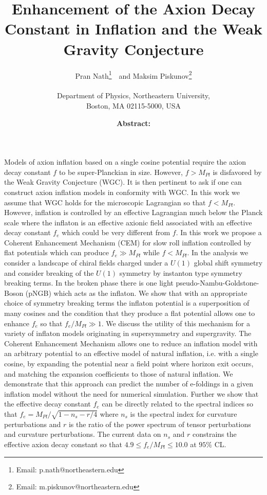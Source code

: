\documentclass[12pt]{article}
\author{
  Pran Nath\footnote{Email: p.nath@northeastern.edu}~\ and
  Maksim Piskunov\footnote{Email: m.piskunov@northeastern.edu}\\~\\
  Department of Physics, Northeastern University,\\
  Boston, MA 02115-5000, USA
}
\title{
  Enhancement of the Axion Decay Constant in Inflation and the Weak Gravity Conjecture
}
\begin{document}
\maketitle
\date

\textbf{Abstract:}
Models of axion inflation based on a single cosine potential require the axion decay constant $f$ to be super-Planckian in size.
However, $f > M_{Pl}$ is disfavored by the Weak Gravity Conjecture (WGC).
It is then pertinent to ask if one can construct axion inflation models in conformity with WGC.
In this work we assume that WGC holds for the microscopic Lagrangian so that $f < M_{Pl}$.
However, inflation is controlled by an effective Lagrangian much below the Planck scale where the inflaton is an effective axionic field associated with an effective decay constant $f_e$ which could be very different from $f$.
In this work we propose a Coherent Enhancement Mechanism (CEM) for slow roll inflation controlled by flat potentials which can produce $f_e \gg M_{Pl}$ while $f < M_{Pl}$.
In the analysis we consider a landscape of chiral fields charged under a $U\left(1\right)$ global shift symmetry and consider breaking of the $U\left(1\right)$ symmetry by instanton type symmetry breaking terms.
In the broken phase there is one light pseudo-Nambu-Goldstone-Boson (pNGB) which acts as the inflaton.
We show that with an appropriate choice of symmetry breaking terms the inflaton potential is a superposition of many cosines and the condition that they produce a flat potential allows one to enhance $f_e$ so that $f_e / M_{Pl} \gg 1$.
We discuss the utility of this mechanism for a variety of inflaton models originating in supersymmetry and supergravity.
The Coherent Enhancement Mechanism allows one to reduce an inflation model with an arbitrary potential to an effective model of natural inflation, i.e. with a single cosine, by expanding the potential near a field point where horizon exit occurs, and matching the expansion coefficients to those of natural inflation.
We demonstrate that this approach can predict the number of e-foldings in a given inflation model without the need for numerical simulation.
Further we show that the effective decay constant $f_e$ can be directly related to the spectral indices so that $f_e = M_{Pl} / \sqrt{1 - n_s - r / 4}$ where $n_s$ is the spectral index for curvature perturbations and $r$ is the ratio of the power spectrum of tensor perturbations and curvature perturbations.
The current data on $n_s$ and $r$ constrains the effective axion decay constant so that $4.9 \leq f_e / M_{Pl} \leq 10.0$ at $95\%$ CL.
\end{document}

